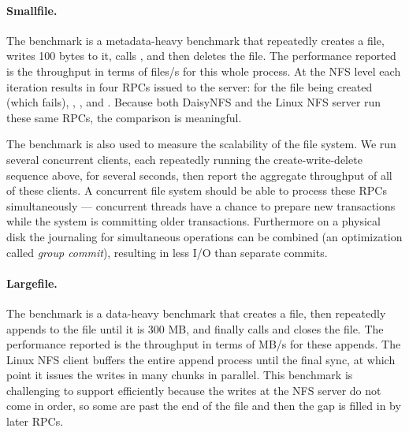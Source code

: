 \paragraph{Smallfile.}
The  benchmark is a metadata-heavy benchmark that repeatedly creates a
file, writes 100 bytes to it, calls , and then deletes the file. The
performance reported is the throughput in terms of files/s for this whole process. At
the NFS level each iteration results in four RPCs issued to the server:  for the file
being created (which fails), , , and . Because
both DaisyNFS and the Linux NFS server run these same RPCs, the comparison is
meaningful.

The  benchmark is also used to measure the scalability of the file
system. We run several concurrent clients, each repeatedly running the
create-write-delete sequence above, for several seconds, then report the
aggregate throughput of all of these clients. A concurrent file system should be
able to process these RPCs simultaneously --- concurrent threads have a chance
to prepare new transactions while the system is committing older transactions.
Furthermore on a physical disk the journaling for simultaneous operations can be
combined (an optimization called \emph{group commit}), resulting in less I/O
than separate commits.

\paragraph{Largefile.}
The  benchmark is a data-heavy benchmark that creates a file, then
repeatedly appends to the file until it is 300 MB, and finally calls
 and closes the file. The performance reported is the throughput in
terms of MB/s for these appends. The Linux NFS client buffers the entire append
process until the final sync, at which point it issues the writes in many chunks
in parallel. This benchmark is challenging to support efficiently because the
writes at the NFS server do not come in order, so some are past the end of the
file and then the gap is filled in by later RPCs.

